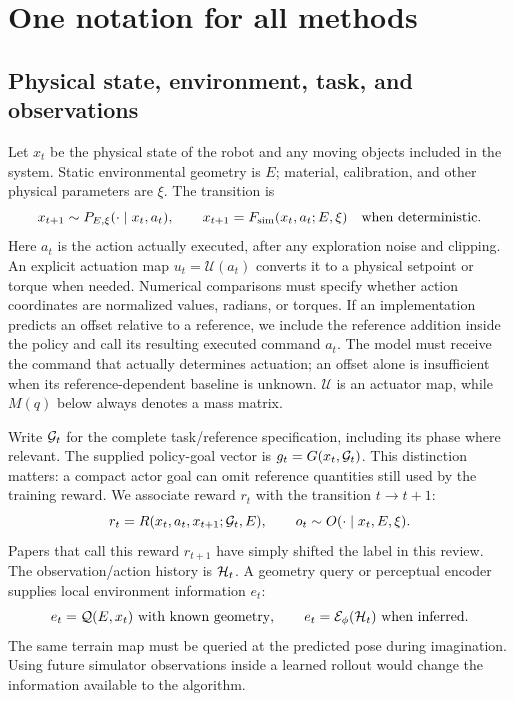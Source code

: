 \section{One notation for all methods}\label{sec:notation}
\subsection{Physical state, environment, task, and observations}
Let $x_t$ be the physical state of the robot and any moving objects included in
the system. Static environmental geometry is $E$; material, calibration, and
other physical parameters are $\xi$. The transition is
\begin{equation}\label{eq:true}
x_{t+1}\sim P_{E,\xi}(\cdot\mid x_t,a_t),\qquad
x_{t+1}=F_{\mathrm{sim}}(x_t,a_t;E,\xi)\quad\text{when deterministic}.
\end{equation}
Here $a_t$ is the action actually executed, after any exploration noise and
clipping. An explicit actuation map $u_t=\mathcal U(a_t)$ converts it to a physical
setpoint or torque when needed. Numerical comparisons must specify whether
action coordinates are normalized values, radians, or torques.
If an implementation predicts an offset relative to a reference, we include
the reference addition inside the policy and call its resulting executed command
$a_t$. The model must receive the command that actually determines actuation;
an offset alone is insufficient when its reference-dependent baseline is unknown.
$\mathcal U$ is an actuator map, while $M(q)$ below always denotes a mass matrix.

Write $\mathcal G_t$ for the complete task/reference specification, including its
phase where relevant. The supplied policy-goal vector is
$g_t=G(x_t,\mathcal G_t)$. This distinction matters: a compact actor goal can omit
reference quantities still used by the training reward. We associate reward
$r_t$ with the transition $t\rightarrow t+1$:
\begin{equation}
r_t=R(x_t,a_t,x_{t+1};\mathcal G_t,E),\qquad
o_t\sim O(\cdot\mid x_t,E,\xi).
\end{equation}
Papers that call this reward $r_{t+1}$ have simply shifted the label in this review.
The observation/action history is $\mathcal H_t$. A geometry query or perceptual
encoder supplies local environment information $e_t$:
\begin{equation}
e_t=\mathcal Q(E,x_t)\ \text{with known geometry},\qquad
e_t=\mathcal E_\phi(\mathcal H_t)\ \text{when inferred}.
\end{equation}
The same terrain map must be queried at the predicted pose during imagination.
Using future simulator observations inside a learned rollout would change the
information available to the algorithm.

